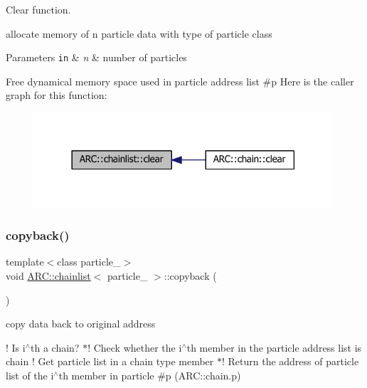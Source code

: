 Clear function. 

allocate memory of n particle data with type of particle class 
\begin{DoxyParams}[1]{Parameters}
\mbox{\tt in}  & {\em n} & number of particles\\
\hline
\end{DoxyParams}
Free dynamical memory space used in particle address list \#p Here is the caller graph for this function\+:
\nopagebreak
\begin{figure}[H]
\begin{center}
\leavevmode
\includegraphics[width=314pt]{classARC_1_1chainlist_af6b33790ba054657d9e132c177ed7f04_icgraph}
\end{center}
\end{figure}
\hypertarget{classARC_1_1chainlist_aba70559e1b70882256a7805744e22b25}{}\label{classARC_1_1chainlist_aba70559e1b70882256a7805744e22b25} 
\subsubsection{\texorpdfstring{copyback()}{copyback()}}
{\footnotesize\ttfamily template$<$class particle\+\_\+$>$ \\
void \hyperlink{classARC_1_1chainlist}{A\+R\+C\+::chainlist}$<$ particle\+\_\+ $>$\+::copyback (\begin{DoxyParamCaption}{ }\end{DoxyParamCaption})\hspace{0.3cm}{\ttfamily [inline]}}



copy data back to original address 

! Is i$^\wedge$th a chain? $\ast$! Check whether the i$^\wedge$th member in the particle address list is chain ! Get particle list in a chain type member $\ast$! Return the address of particle list of the i$^\wedge$th member in particle \#p (A\+R\+C\+::chain.\+p)

